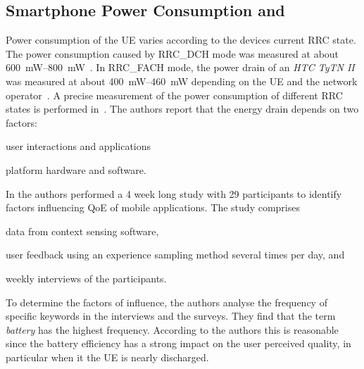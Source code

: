 \subsection{Smartphone Power Consumption and }\label{sec:network:background:energy_consumption_qoe}
Power consumption of the \gls{UE} varies according to the devices current \gls{RRC} state.
The power consumption caused by \gls{RRC_DCH} mode was measured at about \SIrange{600}{800}{\milli\watt}~\cite{Qian2011,Qian2010a}.
In \gls{RRC_FACH} mode, the power drain of an \emph{HTC TyTN II} was measured at about \SIrange{400}{460}{\milli\watt} depending on the \gls{UE} and the network operator~\cite{Qian2010a}.
A precise measurement of the power consumption of different \gls{RRC} states is performed in~\cite{Qian2010a,Balasubramanian2009,Lee2004}. 
The authors report that the energy drain depends on two factors: 
\begin{enumerate*}
\item user interactions and applications 
\item platform hardware and software.
\end{enumerate*}

In \cite{Ickin2012} the authors performed a 4 week long study with 29 participants to identify factors influencing \gls{QoE} of mobile applications.
The study comprises
\begin{enumerate*}
\item data from context sensing software,
\item user feedback using an experience sampling method several times per day, and
\item weekly interviews of the participants.
\end{enumerate*}
To determine the factors of influence, the authors analyse the frequency of specific keywords in the interviews and the surveys.
They find that the term \emph{battery} has the highest frequency.
According to the authors this is reasonable since the battery efficiency has a strong impact on the user perceived quality, in particular when it the \gls{UE} is nearly discharged.